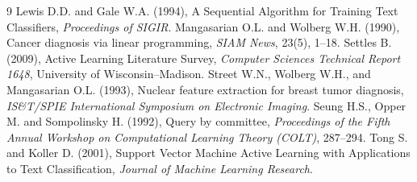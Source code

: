 \documentclass[twoside]{article}
\begin{document}
\newpage
\begin{thebibliography}{9}
	Lewis D.D. and Gale W.A. (1994), A Sequential Algorithm for Training Text Classifiers, {\it Proceedings of SIGIR}.
	Mangasarian O.L. and Wolberg W.H. (1990), Cancer diagnosis via linear programming, {\it SIAM News}, 23(5), 1--18.
	Settles B. (2009), Active Learning Literature Survey, {\it Computer Sciences Technical Report 1648}, University of Wisconsin--Madison.
	Street W.N., Wolberg W.H., and Mangasarian O.L. (1993), Nuclear feature extraction for breast tumor diagnosis, {\it IS\&T/SPIE International Symposium on Electronic Imaging}.
	Seung H.S., Opper M. and Sompolinsky H. (1992), Query by committee, {\it Proceedings of the Fifth Annual Workshop on Computational Learning Theory (COLT)}, 287--294.
	Tong S. and Koller D. (2001), Support Vector Machine Active Learning with Applications to Text Classification, {\it Journal of Machine Learning Research}.
\end{thebibliography}
 
\end{document}

